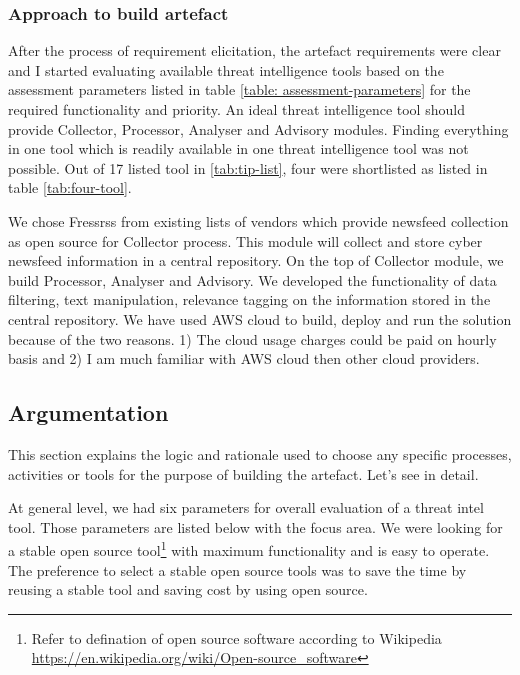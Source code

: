 
\subsubsection{Approach to build artefact}
After the process of requirement elicitation, the artefact requirements were clear and I started evaluating available threat intelligence tools based on the assessment parameters listed in table \ref{table: assessment-parameters} for the required functionality and priority. 
An ideal threat intelligence tool should provide Collector, Processor, Analyser and Advisory modules. Finding everything in one tool which is readily available in one threat intelligence tool was not possible. 
Out of 17 listed tool in \ref{tab:tip-list}, four were shortlisted as listed in table \ref{tab:four-tool}.





We chose Fressrss from existing lists of vendors which provide newsfeed collection as open source for Collector process. This module will collect and store cyber newsfeed information in a central repository. On the top of Collector module, we  build Processor, Analyser and Advisory. We developed the functionality of data filtering, text manipulation, relevance tagging on the information stored in the central repository. We have used AWS cloud to build, deploy and run the solution because of the two reasons. 1) The cloud usage charges could be paid on hourly basis and 2) I am much familiar with AWS cloud then other cloud providers.

\subsection{Argumentation}
This section explains the logic and rationale used to choose any specific processes, activities or tools for the purpose of building the artefact. Let’s see in detail.

At general level, we had six parameters for overall evaluation of a threat intel tool. 
Those parameters are listed below with the focus area. 
We were looking for a stable
\citep{THE-BIT-DEPTH-BLOG} open source tool\footnote{Refer to defination of open source software according to Wikipedia \url{https://en.wikipedia.org/wiki/Open-source_software}} with maximum functionality and is easy to operate. 
The preference to select a stable open source tools was to save the time by reusing a stable tool and saving cost by using open source.


